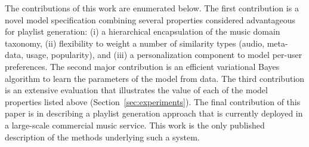 
The contributions of this work are enumerated below. The first  contribution is a novel model specification combining several properties considered advantageous for playlist generation: (i) a hierarchical encapsulation of  the music domain taxonomy, (ii) flexibility to weight a number of similarity types (audio, meta-data, usage, popularity), and (iii) a personalization component to model per-user preferences. The second major contribution is an efficient  variational Bayes algorithm to learn the parameters of the model from data. The third contribution is an extensive evaluation that illustrates the value of each of the model properties listed above (Section~\ref{sec:experiments}). The final contribution of this paper is in describing a playlist generation approach that is currently deployed in a large-scale commercial music service. This work is the only published description of the methods underlying such a system. %
 



